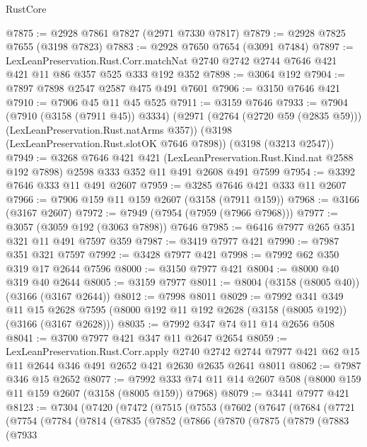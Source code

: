 \begin{lexlean}{RustCore}
\begin{coremodule}
@7875 := @2928 @7861 @7827 (@2971 @7330 @7817)
@7879 := @2928 @7825 @7655 (@3198 @7823)
@7883 := @2928 @7650 @7654 (@3091 @7484)
@7897 := LexLeanPreservation.Rust.Corr.matchNat
    @2740
    @2742
    @2744
    @7646
    @421
    @421
    @11
    @86
    @357
    @525
    @333
    @192
    @352
@7898 := @3064 @192
@7904 := @7897 @7898 @2547 @2587 @475 @491 @7601
@7906 := @3150 @7646 @421
@7910 := @7906 @45 @11 @45 @525
@7911 := @3159 @7646
@7933 := @7904
    (@7910 (@3158 (@7911 @45)) @3334)
    (@2971 (@2764 (@2720 @59 (@2835 @59))) (LexLeanPreservation.Rust.natArms @357))
    (@3198 (LexLeanPreservation.Rust.slotOK @7646 @7898))
    (@3198 (@3213 @2547))
@7949 := @3268
    @7646
    @421
    @421
    (LexLeanPreservation.Rust.Kind.nat @2588 @192 @7898)
    @2598
    @333
    @352
    @11
    @491
    @2608
    @491
    @7599
@7954 := @3392 @7646 @333 @11 @491 @2607
@7959 := @3285 @7646 @421 @333 @11 @2607
@7966 := @7906 @159 @11 @159 @2607 (@3158 (@7911 @159))
@7968 := @3166 (@3167 @2607)
@7972 := @7949 (@7954 (@7959 (@7966 @7968)))
@7977 := @3057 (@3059 @192 (@3063 @7898)) @7646
@7985 := @6416 @7977 @265 @351 @321 @11 @491 @7597 @359
@7987 := @3419 @7977 @421
@7990 := @7987 @351 @321 @7597
@7992 := @3428 @7977 @421
@7998 := @7992 @62 @350 @319 @17 @2644 @7596
@8000 := @3150 @7977 @421
@8004 := @8000 @40 @319 @40 @2644
@8005 := @3159 @7977
@8011 := @8004 (@3158 (@8005 @40)) (@3166 (@3167 @2644))
@8012 := @7998 @8011
@8029 := @7992
    @341
    @349
    @11
    @15
    @2628
    @7595
    (@8000 @192 @11 @192 @2628 (@3158 (@8005 @192)) (@3166 (@3167 @2628)))
@8035 := @7992 @347 @74 @11 @14 @2656 @508
@8041 := @3700 @7977 @421 @347 @11 @2647 @2654
@8059 := LexLeanPreservation.Rust.Corr.apply
    @2740
    @2742
    @2744
    @7977
    @421
    @62
    @15
    @11
    @2644
    @346
    @491
    @2652
    @421
    @2630
    @2635
    @2641
    @8011
@8062 := @7987 @346 @15 @2652
@8077 := @7992 @333 @74 @11 @14 @2607 @508 (@8000 @159 @11 @159 @2607 (@3158 (@8005 @159)) @7968)
@8079 := @3441 @7977 @421
@8123 := @7304
    (@7420
      (@7472
        (@7515
          (@7553
            (@7602
              (@7647
                (@7684
                  (@7721
                    (@7754
                      (@7784
                        (@7814
                          (@7835
                            (@7852
                              (@7866
                                (@7870
                                  (@7875
                                    (@7879
                                      (@7883
                                        (@7933

\end{coremodule}
\end{lexlean}
